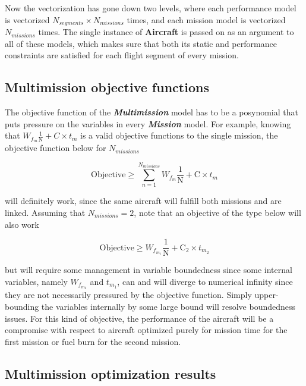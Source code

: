 Now the vectorization has gone down two levels, where each performance model is vectorized $N_{segments} \times N_{missions}$ times,
and each mission model is vectorized $N_{missions}$ times. The single instance of \textbf{Aircraft}
is passed on as an argument to all of these models, which makes sure that both its
static and performance constraints are satisfied for each flight segment
of every mission.

\subsection{Multimission objective functions}

The objective function of the \textbf{\textit{Multimission}} model has to be
a posynomial that puts pressure on the variables in every \textbf{\textit{Mission}} model. For example, knowing that
$W_{f_m} \frac{1}{\mathrm{N}} + C \times t_{m}$ is a valid objective functions to the single mission,
the objective function below for $N_{missions}$

\begin{equation}
    \mathrm{Objective} \geq \sum_{n=1}^{N_{missions}} W_{f_m} \frac{1}{\mathrm{N}} + \mathrm{C} \times t_{m}
    \label{e:compObj}
\end{equation}

will definitely work, since the same aircraft will fulfill both missions and are linked.
Assuming that $N_{missions} = 2$, note that an objective of the type below will also work

\begin{equation}
    \mathrm{Objective} \geq W_{f_{m_{1}}} \frac{1}{\mathrm{N}} + \mathrm{C}_{2} \times t_{m_{2}}
    \label{e:sepObj}
\end{equation}

but will require some management in variable boundedness since some internal variables,
namely  $W_{f_{m_{2}}}$ and $t_{m_{1}}$, can and will diverge to numerical infinity since they
are not necessarily pressured by the objective function.
Simply upper-bounding the variables
internally by some large bound will resolve boundedness issues. For this kind of objective, the
performance of the aircraft will be a compromise with respect to aircraft optimized purely
for mission time for the first mission or fuel burn for the second mission.

\subsection{Multimission optimization results}

